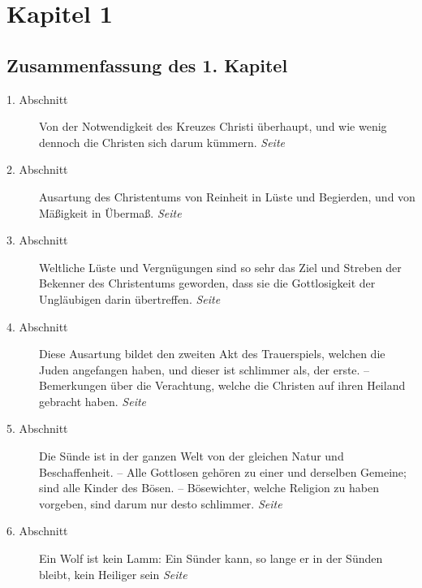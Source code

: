

\chapter{Kapitel 1} \label{kap1}



\section{Zusammenfassung des 1. Kapitel}


\begin{description}
\item[1. Abschnitt] Von der Notwendigkeit des Kreuzes Christi überhaupt, und
wie wenig dennoch die Christen sich darum kümmern.
\dotfill \textit{Seite~\pageref{kap1_ab1}}\\
\item[2. Abschnitt] Ausartung des Christentums von Reinheit in Lüste und
Begierden, und von Mäßigkeit in Übermaß.
\dotfill \textit{Seite~\pageref{kap1_ab2}}\\
\item[3. Abschnitt] Weltliche Lüste und Vergnügungen sind so sehr das Ziel und
Streben der Bekenner des Christentums geworden, dass sie die Gottlosigkeit der
Ungläubigen darin übertreffen.
\dotfill \textit{Seite~\pageref{kap1_ab3}}\\
\item[4. Abschnitt] Diese Ausartung bildet den zweiten Akt des Trauerspiels,
welchen die Juden angefangen haben, und dieser ist schlimmer als, der erste. --
Bemerkungen über die Verachtung, welche die Christen auf ihren Heiland gebracht
haben.
\dotfill \textit{Seite~\pageref{kap1_ab4}}\\
\item[5. Abschnitt] Die Sünde ist in der ganzen Welt von der
gleichen Natur und Beschaffenheit. -- Alle
Gottlosen gehören zu einer und derselben Gemeine;
sind alle Kinder des Bösen. --
Bösewichter, welche Religion zu haben vorgeben, sind darum nur desto schlimmer.
\dotfill \textit{Seite~\pageref{kap1_ab5}}\\
\item[6. Abschnitt] Ein Wolf ist kein Lamm: Ein Sünder kann, so lange er in der
Sünden bleibt, kein Heiliger sein
\dotfill \textit{Seite~\pageref{kap1_ab6}}\\

\end{description}
